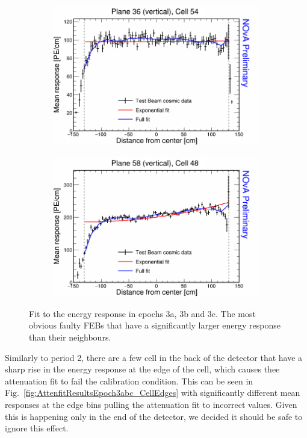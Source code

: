 \begin{figure}[h]
  \begin{subfigure}{0.495\textwidth}
    \includegraphics[width=\linewidth]{Plots/RelativeCalibrationResults/ep3abc_036_054.png}
  \end{subfigure}
  \begin{subfigure}{0.495\textwidth}
    \includegraphics[width=\linewidth]{Plots/RelativeCalibrationResults/ep3abc_058_048.png}
  \end{subfigure}
  \caption[Attenuation fits for cells with faulty readout in period 3 data]{Fit to the energy response in epochs 3a, 3b and 3c. The most obvious faulty FEBs that have a significantly larger energy response than their neighbours.}
  \label{fig:AttenfitResultsEpoch3abc_FaultyFEBs}
\end{figure}

Similarly to period 2, there are a few cell in the back of the detector that have a sharp rise in the energy response at the edge of the cell, which causes thee attenuation fit to fail the calibration condition. This can be seen in Fig.~\ref{fig:AttenfitResultsEpoch3abc_CellEdges} with significantly different mean responses at the edge bins pulling the attenuation fit to incorrect values. Given this is happening only in the end of the detector, we decided it should be safe to ignore this effect.

